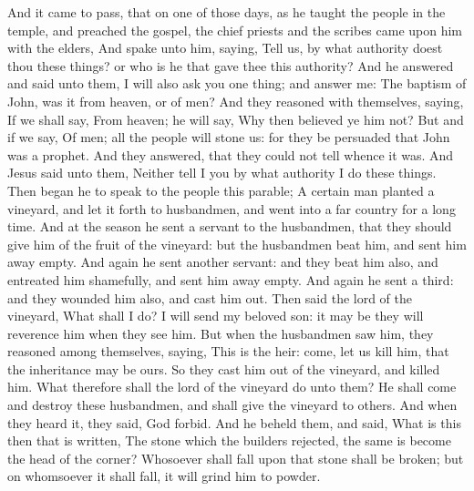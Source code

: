  And it came to pass, that on one of those days, as he
taught the people in the temple, and preached the gospel, the chief
priests and the scribes came upon him with the elders,  And
spake unto him, saying, Tell us, by what authority doest thou these
things? or who is he that gave thee this authority?  And he
answered and said unto them, I will also ask you one thing; and answer
me:  The baptism of John, was it from heaven, or of men?
 And they reasoned with themselves, saying, If we shall say,
From heaven; he will say, Why then believed ye him not?  But
and if we say, Of men; all the people will stone us: for they be
persuaded that John was a prophet.  And they answered, that
they could not tell whence it was.  And Jesus said unto
them, Neither tell I you by what authority I do these things.
 Then began he to speak to the people this parable; A
certain man planted a vineyard, and let it forth to husbandmen, and went
into a far country for a long time.  And at the season he
sent a servant to the husbandmen, that they should give him of the fruit
of the vineyard: but the husbandmen beat him, and sent him away empty.
 And again he sent another servant: and they beat him also,
and entreated him shamefully, and sent him away empty.  And
again he sent a third: and they wounded him also, and cast him out.
 Then said the lord of the vineyard, What shall I do? I
will send my beloved son: it may be they will reverence him when they
see him.  But when the husbandmen saw him, they reasoned
among themselves, saying, This is the heir: come, let us kill him, that
the inheritance may be ours.  So they cast him out of the
vineyard, and killed him. What therefore shall the lord of the vineyard
do unto them?  He shall come and destroy these husbandmen,
and shall give the vineyard to others. And when they heard it, they
said, God forbid.  And he beheld them, and said, What is
this then that is written, The stone which the builders rejected, the
same is become the head of the corner?  Whosoever shall
fall upon that stone shall be broken; but on whomsoever it shall fall,
it will grind him to powder.

